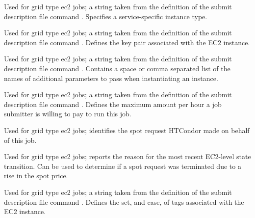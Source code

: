 \begin{description}
\item[\AdAttr{EC2InstanceType}:] 
Used for grid type ec2 jobs;
a string taken from the definition of the submit description file command
.
Specifies a service-specific instance type.

\item[\AdAttr{EC2KeyPair}:] 
Used for grid type ec2 jobs;
a string taken from the definition of the submit description file command
.
Defines the key pair associated with the EC2 instance. 

\item[\AdAttr{EC2ParameterNames}:]
Used for grid type ec2 jobs;
a string taken from the definition of the submit description file command
.
Contains a space or comma separated list of the names of additional
parameters to pass when instantiating an instance.

\item[\AdAttr{EC2SpotPrice}:] 
Used for grid type ec2 jobs;
a string taken from the definition of the submit description file command
.
Defines the maximum amount per hour a job submitter is willing to 
pay to run this job.

\item[\AdAttr{EC2SpotRequestID}:] 
Used for grid type ec2 jobs;
identifies the spot request HTCondor made on behalf of this job.

\item[\AdAttr{EC2StatusReasonCode}:] 
Used for grid type ec2 jobs;
reports the reason for the most recent EC2-level state transition.
Can be used to determine if a spot request was terminated
due to a rise in the spot price.

\item[\AdAttr{EC2TagNames}:] 
Used for grid type ec2 jobs;
a string taken from the definition of the submit description file command
.
Defines the set, and case, of tags associated with the EC2 instance. 


\end{description}
